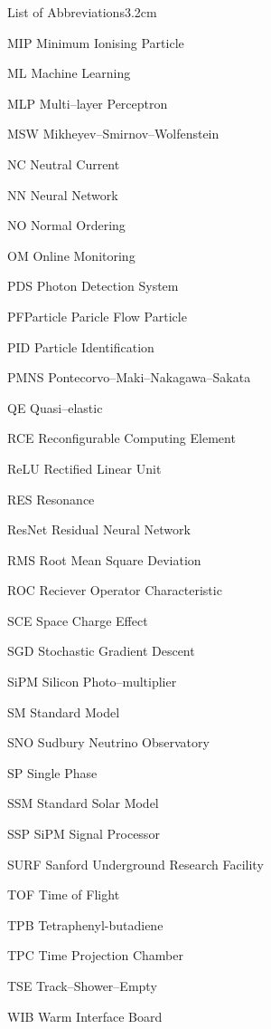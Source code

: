 \begin{mclistof}{List of Abbreviations}{3.2cm}
	\item [ MIP        ] {Minimum Ionising Particle}
	\item [ ML         ] {Machine Learning}
	\item [ MLP        ] {Multi--layer Perceptron}
	\item [ MSW        ] {Mikheyev--Smirnov--Wolfenstein}
	\item [ NC         ] {Neutral Current}
	\item [ NN         ] {Neural Network}
	\item [ NO         ] {Normal Ordering}
	\item [ OM         ] {Online Monitoring}
	\item [ PDS        ] {Photon Detection System}
	\item [ PFParticle ] {Paricle Flow Particle}
	\item [ PID        ] {Particle Identification}
	\item [ PMNS       ] {Pontecorvo--Maki--Nakagawa--Sakata}
	\item [ QE         ] {Quasi--elastic}
	\item [ RCE        ] {Reconfigurable Computing Element}
	\item [ ReLU       ] {Rectified Linear Unit}
	\item [ RES        ] {Resonance}
	\item [ ResNet     ] {Residual Neural Network}
	\item [ RMS        ] {Root Mean Square Deviation}
	\item [ ROC        ] {Reciever Operator Characteristic}
	\item [ SCE        ] {Space Charge Effect}
	\item [ SGD        ] {Stochastic Gradient Descent}
	\item [ SiPM       ] {Silicon Photo--multiplier}
	\item [ SM         ] {Standard Model}
	\item [ SNO        ] {Sudbury Neutrino Observatory}
	\item [ SP         ] {Single Phase}
	\item [ SSM        ] {Standard Solar Model}
	\item [ SSP        ] {SiPM Signal Processor}
	\item [ SURF       ] {Sanford Underground Research Facility}
	\item [ TOF        ] {Time of Flight}
	\item [ TPB        ] {Tetraphenyl-butadiene}
	\item [ TPC        ] {Time Projection Chamber}
	\item [ TSE        ] {Track--Shower--Empty}
	\item [ WIB        ] {Warm Interface Board}
\end{mclistof} 
